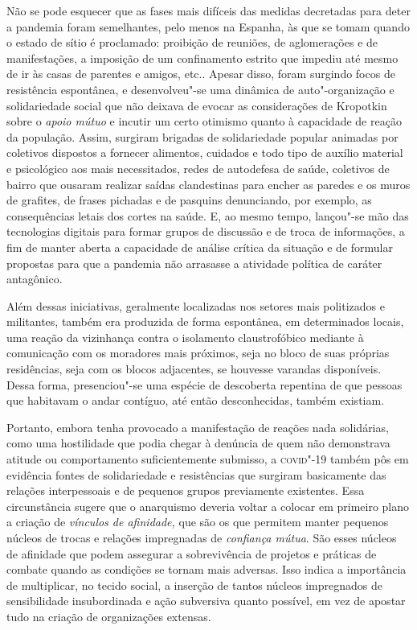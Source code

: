 Não se pode esquecer que as fases mais difíceis das medidas decretadas
para deter a pandemia foram semelhantes, pelo menos na Espanha, às que
se tomam quando o estado de sítio é proclamado: proibição de reuniões,
de aglomerações e de manifestações, a imposição de um confinamento
estrito que impediu até mesmo de ir às casas de parentes e amigos, etc..
Apesar disso, foram surgindo focos de resistência espontânea, e
desenvolveu"-se uma dinâmica de auto"-organização e solidariedade social
que não deixava de evocar as considerações de Kropotkin sobre o
\textit{apoio mútuo} e incutir um certo otimismo quanto à capacidade de
reação da população. Assim, surgiram brigadas de solidariedade popular
animadas por coletivos dispostos a fornecer alimentos, cuidados e todo
tipo de auxílio material e psicológico aos mais necessitados, redes de
autodefesa de saúde, coletivos de bairro que ousaram realizar saídas
clandestinas para encher as paredes e os muros de grafites, de frases
pichadas e de pasquins denunciando, por exemplo, as consequências letais
dos cortes na saúde. E, ao mesmo tempo, lançou"-se mão das tecnologias
digitais para formar grupos de discussão e de troca de informações, a
fim de manter aberta a capacidade de análise crítica da situação e de
formular propostas para que a pandemia não arrasasse a atividade
política de caráter antagônico.

Além dessas iniciativas, geralmente localizadas nos setores mais
politizados e militantes, também era produzida de forma espontânea, em
determinados locais, uma reação da vizinhança contra o isolamento
claustrofóbico mediante à comunicação com os moradores mais próximos,
seja no bloco de suas próprias residências, seja com os blocos
adjacentes, se houvesse varandas disponíveis. Dessa forma, presenciou"-se
uma espécie de descoberta repentina de que pessoas que habitavam o andar
contíguo, até então desconhecidas, também existiam.

Portanto, embora tenha provocado a manifestação de reações nada
solidárias, como uma hostilidade que podia chegar à denúncia de quem não
demonstrava atitude ou comportamento suficientemente submisso, a
\textsc{covid}"-19 também pôs em evidência fontes de solidariedade e resistências
que surgiram basicamente das relações interpessoais e de pequenos grupos
previamente existentes. Essa circunstância sugere que o anarquismo
deveria voltar a colocar em primeiro plano a criação de \textit{vínculos
de afinidade,} que são os que permitem manter pequenos núcleos de trocas
e relações impregnadas de \textit{confiança mútua}. São esses núcleos de
afinidade que podem assegurar a sobrevivência de projetos e práticas de
combate quando as condições se tornam mais adversas. Isso indica a
importância de multiplicar, no tecido social, a inserção de tantos
núcleos impregnados de sensibilidade insubordinada e ação subversiva
quanto possível, em vez de apostar tudo na criação de organizações
extensas.

